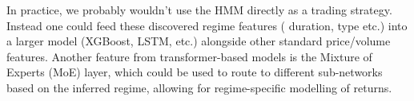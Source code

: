 \documentclass{article}
\begin{document}
In practice, we probably wouldn't use the HMM directly as a trading strategy. Instead one could feed these discovered regime features ( duration, type etc.) into a larger model (XGBoost, LSTM, etc.) alongside other standard price/volume features. Another feature from transformer-based models is the Mixture of Experts (MoE) layer, which could be used to route to different sub-networks based on the inferred regime, allowing for regime-specific modelling of returns.\\


\clearpage
\printbibliography
\end{document}
